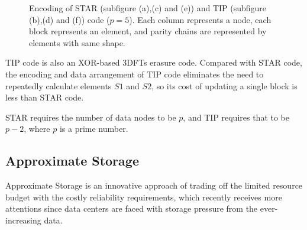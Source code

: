 \documentclass[sigconf]{acmart}
\begin{document}
\begin{figure}[!ht]
\hspace{5pt}
\caption{Encoding of STAR (subfigure (a),(c) and (e)) and TIP (subfigure (b),(d) and (f)) code ($p = 5$). Each column represents a node, each block represents an element, and parity chains are represented by elements with same shape.}
\label{fig-star-tip}
\end{figure}

TIP code is also an XOR-based 3DFTs erasure code.
Compared with STAR code, the encoding and data arrangement of TIP code eliminates the need to repeatedly calculate elements $S1$ and $S2$, so its cost of updating a single block is less than STAR code.

STAR requires the number of data nodes to be $p$, and TIP requires that to be $p-2$, where $p$ is a prime number.


\subsection{Approximate Storage}
Approximate Storage is an innovative approach of trading off the limited resource budget with the costly reliability requirements, which recently receives more attentions since data centers are faced with storage pressure from the ever-increasing data.
\end{document}
